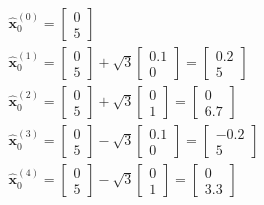 \begin{eqnarray}
\hat{\mathbf{x}}_{0}^{(0)} = 
\begin{bmatrix}
0 \\
5 
\end{bmatrix} \\ 
\hat{\mathbf{x}}_{0}^{(1)} = 
\begin{bmatrix}
0 \\
5 
\end{bmatrix} + \sqrt{3} 
\begin{bmatrix}
0.1 \\
0 
\end{bmatrix} =
\begin{bmatrix}
0.2 \\
5 
\end{bmatrix} \\
\hat{\mathbf{x}}_{0}^{(2)} = 
\begin{bmatrix}
0 \\
5 
\end{bmatrix} + \sqrt{3} 
\begin{bmatrix}
0 \\
1 
\end{bmatrix} =
\begin{bmatrix}
0 \\
6.7 
\end{bmatrix} \\
\hat{\mathbf{x}}_{0}^{(3)} = 
\begin{bmatrix}
0 \\
5 
\end{bmatrix} - \sqrt{3} 
\begin{bmatrix}
0.1 \\
0 
\end{bmatrix} =
\begin{bmatrix}
-0.2 \\
5
\end{bmatrix} \\
\hat{\mathbf{x}}_{0}^{(4)} = 
\begin{bmatrix}
0 \\
5 
\end{bmatrix} - \sqrt{3} 
\begin{bmatrix}
0 \\
1 
\end{bmatrix} =
\begin{bmatrix}
0 \\
3.3
\end{bmatrix} 
\label{ukf_example_data}
\end{eqnarray}


